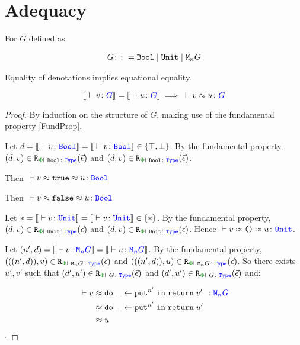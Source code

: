 \documentclass{Report}
\newcommand\erelates[2]{\texttt{R}_{\wellformedt{#1}{#2}}}
\newcommand\inLogRel[5]{(#1, #2)\in\erelates{#3}{#4}(#5)}
\newcommand\inLogRelE[4]{\inLogRel{#1}{#2}{#3}{#4}{\ev}}
\newcommand{\inLogRelPE}[3]{\inLogRelE{#1}{#2}{\P}{#3}}
\begin{document}
\section{Adequacy}
\begin{theorem}[Adequacy]
For $G$ defined as:

\begin{align*}
    G\colon\colon= \texttt{Bool} \mid \texttt{Unit} \mid \texttt{M}_{n}{G}
\end{align*}

Equality of denotations implies equational equality.

\begin{equation}
    \deno{\ztyperelation{v}{G}} = \deno{\ztyperelation{u}{G}} \implies \zberelation{v}{u}{G}
\end{equation}

\end{theorem}

\begin{proof}
    By induction on the structure of $G$, making use of the fundamental property \ref{FundProp}.

    Let $d=\deno{\ztyperelation{v}{\B}}=\deno{\ztyperelation{v}{\B}}\in \{ \top, \bot\}$. By the fundamental property, $\inLogRelPE{d}{v}{\B}$  and $\inLogRelPE{d}{v}{\B}$.

    Then $\zberelation{v\beequiv\t}{u}{\B}$

    
    Then $\zberelation{v\beequiv\f}{u}{\B}$

    Let $\singleton=\deno{\ztyperelation{v}{\U}}=\deno{\ztyperelation{v}{\U}}\in \{\singleton\}$. By the fundamental property, $\inLogRelPE{d}{v}{\U}$  and $\inLogRelPE{d}{v}{\U}$. Hence $\zberelation{v\beequiv\u}{u}{\U}$.

    \case{\teffect}

    Let $( n',  d) = \deno{\ztyperelation{v}{\M{n}{G}}} = \deno{\ztyperelation{u}{\M{n}{G}}}$. By the fundamental property, $\inLogRelPE{((n', d))}{v}{\M{n}{G}}$ and $\inLogRelPE{((n', d))}{u}{\M{n}{G}}$. So there exists $u', v'$ such that $\inLogRelPE{d'}{u'}{G}$ and $\inLogRelPE{d'}{u'}{G}$ and:

    \begin{align*}
        \zberelation{v&}{\doin{\_}{\put^{n'}}{\return{v'}}}{\M{n}{G}}\\
        &\beequiv \doin{\_}{\put^{n'}}{\return{u'}}\\
        & \beequiv u
    \end{align*}
$\square$
\end{proof}
\end{document}
